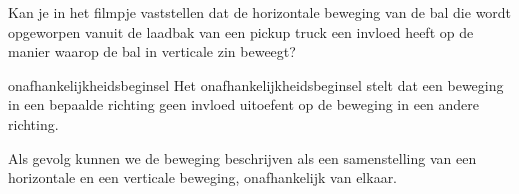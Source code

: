 \documentclass{ximera}
\begin{document}
	\author{Bart Lambregs}
    \xmsource\xmuitleg

\begin{denkvraag*}{}
	Kan je in het filmpje vaststellen dat de horizontale beweging van de bal die wordt opgeworpen vanuit de laadbak van een pickup truck een invloed heeft op de manier waarop de bal in verticale zin beweegt?
	\begin{center}
	\end{center}
\end{denkvraag*}

\begin{definition}{onafhankelijkheidsbeginsel}
	Het onafhankelijkheidsbeginsel stelt dat een beweging in een bepaalde richting geen invloed uitoefent op de beweging in een andere richting. 
\end{definition}

Als gevolg kunnen we de beweging beschrijven als een samenstelling van een horizontale en een verticale beweging, onafhankelijk van elkaar.
\end{document}

